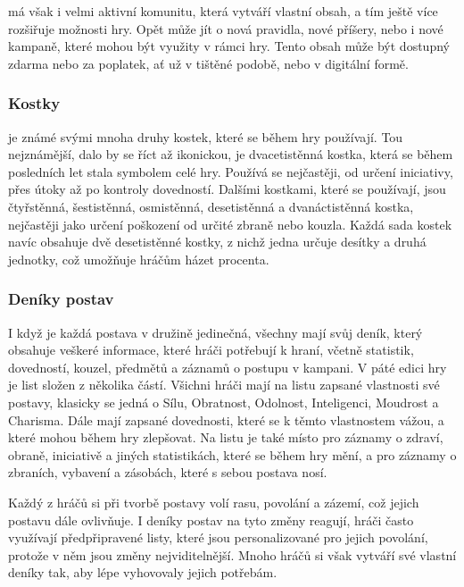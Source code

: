 \dnd{} má však i velmi aktivní komunitu, která vytváří vlastní obsah, a tím ještě více rozšiřuje možnosti hry. Opět může jít o nová pravidla, nové příšery, nebo i nové kampaně, které mohou být využity v rámci hry. Tento obsah může být dostupný zdarma nebo za poplatek, ať už v tištěné podobě, nebo v digitální formě.

\subsubsection*{Kostky}
\label{subsubsec:dnd_comp_dice}

\dnd{} je známé svými mnoha druhy kostek, které se během hry používají. Tou nejznámější, dalo by se říct až ikonickou, je dvacetistěnná kostka, která se během posledních let stala symbolem celé hry. Používá se nejčastěji, od určení iniciativy, přes útoky až po kontroly dovedností. Dalšími kostkami, které se používají, jsou čtyřstěnná, šestistěnná, osmistěnná, desetistěnná a dvanáctistěnná kostka, nejčastěji jako určení poškození od určité zbraně nebo kouzla. Každá sada kostek navíc obsahuje dvě desetistěnné kostky, z nichž jedna určuje desítky a druhá jednotky, což umožňuje hráčům házet procenta.

\subsubsection*{Deníky postav}
\label{subsubsec:dnd_comp_sheets}

I když je každá postava v družině jedinečná, všechny mají svůj deník, který obsahuje veškeré informace, které hráči potřebují k hraní, včetně statistik, dovedností, kouzel, předmětů a záznamů o postupu v kampani. V páté edici hry je list složen z několika částí. Všichni hráči mají na listu zapsané vlastnosti své postavy, klasicky se jedná o Sílu, Obratnost, Odolnost, Inteligenci, Moudrost a Charisma. Dále mají zapsané dovednosti, které se k těmto vlastnostem vážou, a které mohou během hry zlepšovat. Na listu je také místo pro záznamy o zdraví, obraně, iniciativě a jiných statistikách, které se během hry mění, a pro záznamy o zbraních, vybavení a zásobách, které s sebou postava nosí.

Každý z hráčů si při tvorbě postavy volí rasu, povolání a zázemí, což jejich postavu dále ovlivňuje. I deníky postav na tyto změny reagují, hráči často využívají předpřipravené listy, které jsou personalizované pro jejich povolání, protože v něm jsou změny nejviditelnější. Mnoho hráčů si však vytváří své vlastní deníky tak, aby lépe vyhovovaly jejich potřebám.

